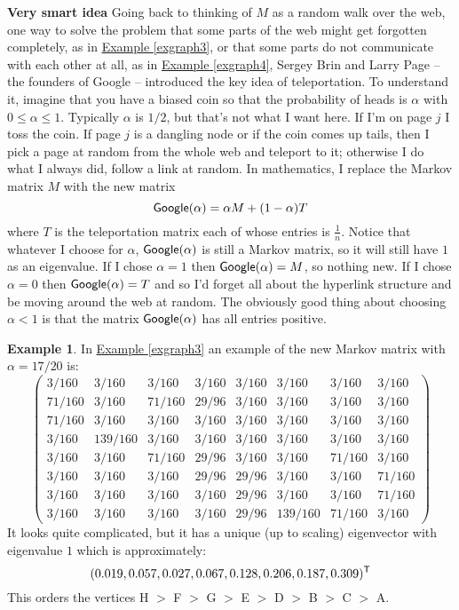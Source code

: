 \documentclass[11pt]{amsbook}
\theoremstyle{definition}
\newtheorem{ex}[theorem]{Example}
\begin{document}
{\bf Very smart idea} Going back to thinking of $M$ as a random walk over the web, one way to solve the problem that some parts of the web might get forgotten completely, as in \hyperref[exgraph3]{Example \ref{exgraph3}}, or that some parts do not communicate with each other at all, as in \hyperref[exgraph4]{Example \ref{exgraph4}}, Sergey Brin and Larry Page -- the founders of Google -- introduced the key idea of teleportation. To understand it, imagine that you have a biased coin so that the probability of heads is $\alpha$ with $0\leqslant \alpha \leqslant 1$. Typically $\alpha$ is $1/2$, but that's not what I want here. If I'm on page $j$ I toss the coin. If page $j$ is a dangling node or if the coin comes up tails, then I pick a page at random from the whole web and teleport to it; otherwise I do what I always did, follow a link at random. In mathematics, I replace the Markov matrix $M$ with the new matrix $${\sf Google}(\alpha) = \alpha M + (1-\alpha)T$$ where $T$ is the teleportation matrix each of whose entries is $\frac{1}{n}$. Notice that whatever I choose for $\alpha$, ${\sf Google}(\alpha)$ is still a Markov matrix, so it will still have $1$ as an eigenvalue.  If I chose $\alpha = 1$ then ${\sf Google}(\alpha) = M$, so nothing new. If I chose $\alpha = 0$ then ${\sf Google}(\alpha) = T$ and so I'd forget all about the hyperlink structure and be moving around the web at random. The obviously good thing about choosing $\alpha <1$ is that the matrix ${\sf Google}(\alpha)$ has all entries positive.

\begin{ex}
In \hyperref[exgraph3]{Example \ref{exgraph3}} an example of the new Markov matrix with $\alpha = 17/20$  is: $$ \begin{pmatrix}  3/160 & 3/160 & 3/160 & 3/160 & 3/160 & 3/160 & 3/160 & 3/160 \\ 71/160 & 3/160 & 71/160 & 29/96 & 3/160 & 3/160 & 3/160 & 3/160 \\ 71/160 & 3/160 & 3/160 & 3/160 & 3/160 & 3/160 & 3/160& 3/160 \\ 3/160 & 139/160  & 3/160 & 3/160 & 3/160 & 3/160 & 3/160 & 3/160 \\ 3/160 & 3/160 & 71/160 & 29/96 & 3/160 & 3/160 & 71/160 & 3/160  \\ 3/160 & 3/160 & 3/160 & 29/96 & 29/96 & 3/160 & 3/160 & 71/160 \\ 3/160 & 3/160 & 3/160 & 3/160 & 29/96 & 3/160 & 3/160 & 71/160 \\ 3/160 & 3/160 & 3/160 & 3/160 & 29/96 & 139/160 & 71/160 & 3/160 \end{pmatrix}$$ It looks quite complicated, but it has a unique (up to scaling) eigenvector with eigenvalue $1$ which is approximately:
$$
(0.019, 0.057, 0.027, 0.067, 0.128, 0.206, 0.187,  0.309)^{\sf T}
$$
This orders the vertices H $>$ F $>$ G $>$ E $>$ D $>$ B $>$ C $>$ A.
\end{ex}
\end{document}
